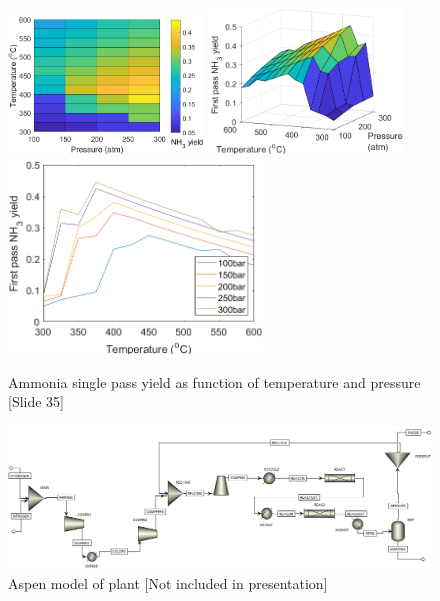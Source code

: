     {\begin{figure}[H]
		\centering
		\caption{Ammonia single pass yield as function of temperature and pressure [Slide 35]}
		{\centering
			\includegraphics[width=0.46\textwidth]{ammoniasynth/handout/graphics/TPopNEW1.png}	
			\includegraphics[width=0.46\textwidth]{ammoniasynth/handout/graphics/TPopNEW2.png}	
			\includegraphics[width=0.6\textwidth]{ammoniasynth/handout/graphics/TPopNEW3.png}	
			 \label{fig:opt}
		}
\end{figure}}
    
    
      \begin{figure}[H]
        \centering
        \includegraphics[width=1\textwidth]{ammoniasynth/handout/graphics/aspen}
        \caption{Aspen model of plant [Not included in presentation]}
        \label{fig:SSaspen}
    \end{figure}
    
